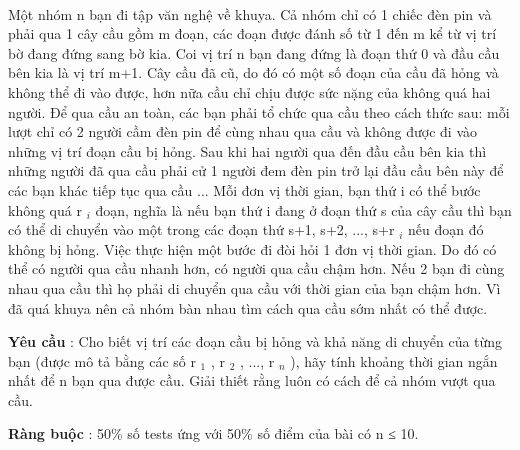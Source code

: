  

Một nhóm n bạn đi tập văn nghệ về khuya. Cả nhóm chỉ có 1 chiếc đèn pin và phải qua 1 cây cầu gồm m đoạn, các đoạn được đánh số từ 1 đến m kể từ vị trí bờ đang đứng sang bờ kia. Coi vị trí n bạn đang đứng là đoạn thứ 0 và đầu cầu bên kia là vị trí m+1. Cây cầu đã cũ, do đó có một số đoạn của cầu đã hỏng và không thể đi vào được, hơn nữa cầu chỉ chịu được sức nặng của không quá hai người. Để qua cầu an toàn, các bạn phải tổ chức qua cầu theo cách thức sau: mỗi lượt chỉ có 2 người cầm đèn pin để cùng nhau qua cầu và không được đi vào những vị trí đoạn cầu bị hỏng. Sau khi hai người qua đến đầu cầu bên kia thì những người đã qua cầu phải cử 1 người đem đèn pin trở lại đầu cầu bên này để các bạn khác tiếp tục qua cầu ... Mỗi đơn vị thời gian, bạn thứ i có thể bước không quá r $_ i $ đoạn, nghĩa là nếu bạn thứ i đang ở đoạn thứ s của cây cầu thì bạn có thể di chuyển vào một trong các đoạn thứ s+1, s+2, ..., s+r $_ i $ nếu đoạn đó không bị hỏng. Việc thực hiện một bước đi đòi hỏi 1 đơn vị thời gian. Do đó có thể có người qua cầu nhanh hơn, có người qua cầu chậm hơn. Nếu 2 bạn đi cùng nhau qua cầu thì họ phải di chuyển qua cầu với thời gian của bạn chậm hơn. Vì đã quá khuya nên cả nhóm bàn nhau tìm cách qua cầu sớm nhất có thể được.

\textbf{Yêu cầu } : Cho biết vị trí các đoạn cầu bị hỏng và khả năng di chuyển của từng bạn (được mô tả bằng các số r $_ 1 $ , r $_ 2 $ , ..., r $_ n $ ), hãy tính khoảng thời gian ngắn nhất để n bạn qua được cầu. Giải thiết rằng luôn có cách để cả nhóm vượt qua cầu.

\textbf{Ràng buộc } : 50\% số tests ứng với 50\% số điểm của bài có n ≤ 10.